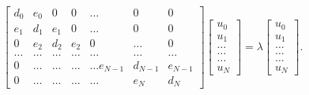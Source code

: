 \documentclass[12pt]{article}
\begin{document}
\begin{equation}
    \begin{bmatrix}d_0 & e_0 & 0   & 0    & \dots  &0     & 0 \\
    e_1 & d_1 & e_1 & 0    & \dots  &0     &0 \\
    0   & e_2 & d_2 & e_2  &0       &\dots & 0\\
    \dots  & \dots & \dots & \dots  &\dots      &\dots & \dots\\
    0   & \dots & \dots & \dots  &\dots  e_{N-1}     &d_{N-1} & e_{N-1}\\
    0   & \dots & \dots & \dots  &\dots       &e_{N} & d_{N}
\end{bmatrix}
\begin{bmatrix} u_{0} \\
    u_{1} \\
    \dots\\ \dots\\ \dots\\
    u_{N}
    \end{bmatrix}=\lambda \begin{bmatrix} u_{0} \\
    u_{1} \\
    \dots\\ \dots\\ \dots\\
    u_{N}
    \end{bmatrix}.  
    \label{eq:sematrix}
\end{equation}
\end{document}
